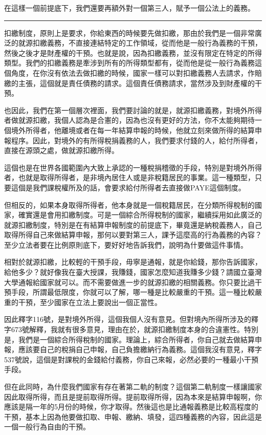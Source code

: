\documentclass[oneside,sub3section]{ctexbook}
\begin{document}
在這樣一個前提底下，我們還要再額外對一個第三人，賦予一個公法上的義務。

\begin{center}\rule{0.5\linewidth}{0.5pt}\end{center}

扣繳制度，原則上是要求，你給東西的時候要先做扣繳，那由於我們是一個非常廣泛的就源扣繳義務，不直接連結特定的工作領域，從而他是一般行為義務的干預，然後之後才是財產權的干預。也就是說，因為扣繳義務，並沒有限定在特定的所得類型。我們的扣繳義務是牽涉到所有的所得類型都有，從而他是從一般行為義務這個角度，在你沒有依法去做扣繳的時候，國家一樣可以對扣繳義務人去請求，作賠繳的主張，這個就是責任債務的請求。這個責任債務請求，當然涉及到財產權的干預。

也因此，我們在第一個層次裡面，我們要討論的就是，就源扣繳義務，對境外所得者做就源扣繳，我個人認為是合憲的，因為也沒有更好的方法，你不太能夠期待一個境外所得者，他離境或者在每一年結算申報的時候，他就立刻來做所得的結算申報程序。因此，對境外的有所得稅捐義務的人，我們要求付錢的人，給付所得者，直接在源頭之處，做就源扣繳所得。

這個也是在世界各國範圍內大致上承認的一種稅捐稽徵的手段，特別是對境外所得者，也就是取得所得者，是非境內居住人或是非稅籍居民的事業。這一種類型，只要這個是我們課稅權所及的話，會要求給付所得者去直接做PAYE這個制度。

但相反的，如果本身取得所得者，他本身就是一個稅籍居民，在分類所得稅制的國家，確實還是會用扣繳制度。可是一個綜合所得稅制的國家，繼續採用如此廣泛的就源扣繳制度，特別是在有結算申報制度的前提底下，畢竟還是納稅義務人，自己取得所得自己來做結算申報，那何以要對第三人，課予這麼高的行為義務的內容？至少立法者要在比例原則底下，要好好地告訴我們，說明為什要做這件事情。

相對於就源扣繳，比較輕的干預手段，毋寧是通報，就是你給錢，那你告訴國家，給他多少？就好像我在臺大授課，我賺錢，國家怎麼知道我賺多少錢？請國立臺灣大學通報給國家就可以。而不需要做進一步的就源扣繳的相關義務。你只要比過干預手段，所謂最低限度，你就可以了解，哪一種是比較嚴重的干預。這一種比較嚴重的干預，至少國家在立法上要說出一個正當性。

因此釋字116號，是對境外所得，這個我個人沒有意見。但對境內所得所涉及的釋字673號解釋，我就有很多意見，理由在於，就源扣繳制度本身的合違憲性。特別是，我們是一個綜合所得稅制的國家。理論上，綜合所得者，你自己就去做結算申報，應該要自己的稅捐自己申報，自己負擔繳納行為義務。這個我沒有意見，釋字537號說，這個是對課稅的金錢給付義務，你自己來報，必然必要的一種最小干預手段。

但在此同時，為什麼我們國家有存在著第二軌的制度？這個第二軌制度一樣讓國家因此取得所得，而且是提前取得所得。提前取得所得，因為本來是結算申報啊，你應該是隔一年的5月份的時候，你才取得。然後這也是比通報義務是比較高程度的干預，基本上因為他要做扣取、申報、繳納、填發，這四種義務的內容，因此這是一個一般行為自由的干預。
\end{document}
